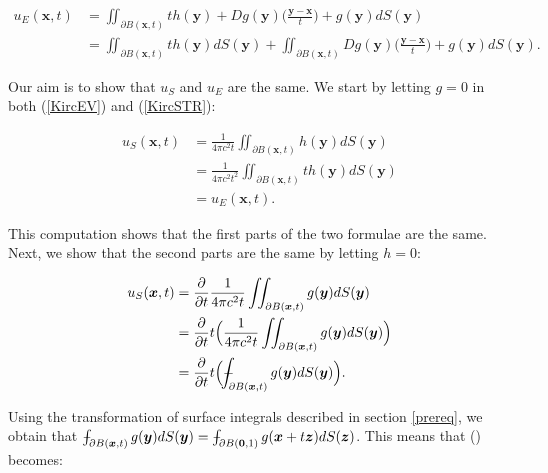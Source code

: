 \documentclass[a4paper, 12pt]{article}
\def\Xint#1{\mathchoice
{\XXint\displaystyle\textstyle{#1}}%
{\XXint\textstyle\scriptstyle{#1}}%
{\XXint\scriptstyle\scriptscriptstyle{#1}}%
{\XXint\scriptscriptstyle\scriptscriptstyle{#1}}%
\!\int}
\def\XXint#1#2#3{{\setbox0=\hbox{$#1{#2#3}{\int}$ }
\vcenter{\hbox{$#2#3$ }}\kern-.6\wd0}}
\def\dashint{\Xint-}
\numberwithin{equation}{section}
\begin{document}
\begin{equation*}
    \begin{aligned}
    u_E(\boldsymbol{x},t)&=\iint_{\partial B(\boldsymbol{x},t)} th(\boldsymbol{y})+Dg(\boldsymbol{y})\Big(\frac{\boldsymbol{y}-\boldsymbol{x}}{t}\Big)+g(\boldsymbol{y})dS(\boldsymbol{y})\\ 
    &=\iint_{\partial B(\boldsymbol{x},t)} th(\boldsymbol{y})dS(\boldsymbol{y})+\iint_{\partial B(\boldsymbol{x},t)} Dg(\boldsymbol{y})\Big(\frac{\boldsymbol{y}-\boldsymbol{x}}{t}\Big)+g(\boldsymbol{y})dS(\boldsymbol{y}).
    \end{aligned}
\end{equation*}

Our aim is to show that $u_S$ and $u_E$ are the same. We start by letting $g=0$
in both (\ref{KircEV}) and (\ref{KircSTR}):

\begin{equation} \label{g=0}
    \begin{aligned}
        u_S(\boldsymbol{x}, t)&=\frac{1}{4\pi c^2 t}\iint_{\partial B(\boldsymbol{x}, t)}h(\boldsymbol{y})dS(\boldsymbol{y})\\
        &=\frac{1}{4\pi c^2 t^2}\iint_{\partial B(\boldsymbol{x}, t)}th(\boldsymbol{y})dS(\boldsymbol{y})\\
        &=u_E(\boldsymbol{x}, t).
    \end{aligned}
\end{equation}

This computation shows that the first parts of the two formulae are the same.
Next, we show that the second parts are the same by letting $h=0$:

\begin{equation} \label{starr}
    \begin{aligned}
        u_S(\boldsymbol{x},t)&=\diffp[1]{}{t}\frac{1}{4\pi c^2 t}\iint_{\partial B(\boldsymbol{x}, t)}g(\boldsymbol{y})dS(\boldsymbol{y})\\
        &=\diffp[1]{}{t}t\Big(\frac{1}{4\pi c^2 t}\iint_{\partial B(\boldsymbol{x}, t)}g(\boldsymbol{y})dS(\boldsymbol{y})\Big)\\
        &=\diffp[1]{}{t}t\Big(\dashint_{\partial B(\boldsymbol{x}, t)}g(\boldsymbol{y})dS(\boldsymbol{y})\Big).
    \end{aligned}
\end{equation}

Using the transformation of surface integrals described in section \ref{prereq},
we obtain that $\dashint_{\partial B(\boldsymbol{x},
t)}g(\boldsymbol{y})dS(\boldsymbol{y})=\dashint_{\partial B(\boldsymbol{0},
1)}g(\boldsymbol{x}+t\boldsymbol{z})dS(\boldsymbol{z})$. This means that
(\label{starr}) becomes:
 
\end{document}
